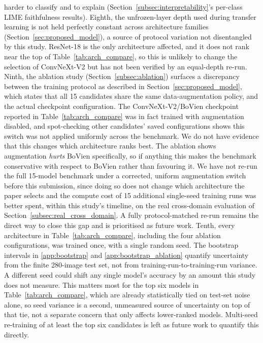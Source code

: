 harder to classify and to explain (Section~\ref{subsec:interpretability}'s per-class LIME faithfulness results). Eighth, the unfrozen-layer depth used during transfer learning is not held perfectly constant across architecture families (Section~\ref{sec:proposed_model}), a source of protocol variation not disentangled by this study. ResNet-18 is the only architecture affected, and it does not rank near the top of Table~\ref{tab:arch_compare}, so this is unlikely to change the selection of ConvNeXt-V2 but has not been verified by an equal-depth re-run. Ninth, the ablation study (Section~\ref{subsec:ablation}) surfaces a discrepancy between the training protocol as described in Section~\ref{sec:proposed_model}, which states that all 15 candidates share the same data-augmentation policy, and the actual checkpoint configuration. The ConvNeXt-V2/BoVien checkpoint reported in Table~\ref{tab:arch_compare} was in fact trained with augmentation disabled, and spot-checking other candidates' saved configurations shows this switch was not applied uniformly across the benchmark. We do not have evidence that this changes which architecture ranks best. The ablation shows augmentation \emph{hurts} BoVien specifically, so if anything this makes the benchmark conservative with respect to BoVien rather than favouring it. We have not re-run the full 15-model benchmark under a corrected, uniform augmentation switch before this submission, since doing so does not change which architecture the paper selects and the compute cost of 15 additional single-seed training runs was better spent, within this study's timeline, on the real cross-domain evaluation of Section~\ref{subsec:real_cross_domain}. A fully protocol-matched re-run remains the direct way to close this gap and is prioritised as future work. Tenth, every architecture in Table~\ref{tab:arch_compare}, including the four ablation configurations, was trained once, with a single random seed. The bootstrap intervals in \ref{app:bootstrap} and \ref{app:bootstrap_ablation} quantify uncertainty from the finite 280-image test set, not from training-run-to-training-run variance. A different seed could shift any single model's accuracy by an amount this study does not measure. This matters most for the top six models in Table~\ref{tab:arch_compare}, which are already statistically tied on test-set noise alone, so seed variance is a second, unmeasured source of uncertainty on top of that tie, not a separate concern that only affects lower-ranked models. Multi-seed re-training of at least the top six candidates is left as future work to quantify this directly.
